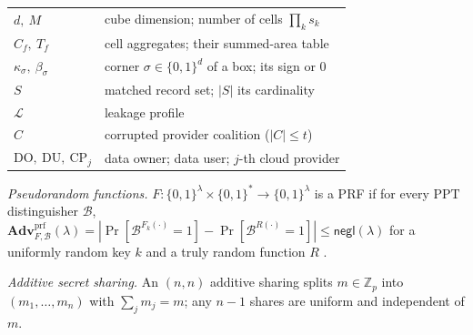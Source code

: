 \documentclass[a4paper,fleqn]{cas-sc}
\newcommand{\negl}{\mathsf{negl}}
\newcommand{\PPT}{\mathrm{PPT}}
\newcommand{\Leak}{\mathcal{L}}
\newcommand{\advPRF}{\mathbf{Adv}^{\mathrm{prf}}}
\begin{document}
\begin{table}[pos=htbp]
\begin{tabular}{@{}l>{\raggedright\arraybackslash}p{5.5cm}@{}}
$d,\ M$ & cube dimension; number of cells $\prod_k s_k$ \\
$C_f,\ T_f$ & cell aggregates; their summed-area table \\
$\kappa_\sigma,\ \beta_\sigma$ & corner $\sigma\in\{0,1\}^d$ of a box; its sign or $0$ \\
$S$ & matched record set; $|S|$ its cardinality \\
$\Leak$ & leakage profile \\
$C$ & corrupted provider coalition ($|C|\le t$) \\
$\mathrm{DO,\ DU},\ \text{CP}_j$ & data owner; data user; $j$-th cloud
provider \\
\bottomrule
\end{tabular}
\end{table}

\emph{Pseudorandom functions.} $F:\{0,1\}^\lambda\times\{0,1\}^*\!\to\!
\{0,1\}^\lambda$ is a PRF if for every $\PPT$ distinguisher $\mathcal{B}$,
$\advPRF_{F,\mathcal{B}}(\lambda)=|\Pr[\mathcal{B}^{F_k(\cdot)}=1]-
\Pr[\mathcal{B}^{R(\cdot)}=1]|\le\negl(\lambda)$ for a uniformly random key
$k$ and a truly random function $R$ \citep{goldreich2019construct}.

\emph{Additive secret sharing.} An $(n,n)$ additive sharing splits
$m\in\mathbb{Z}_p$ into $(m_1,\dots,m_n)$ with $\sum_j m_j=m$; any $n-1$
shares are uniform and independent of $m$.
\end{document}
